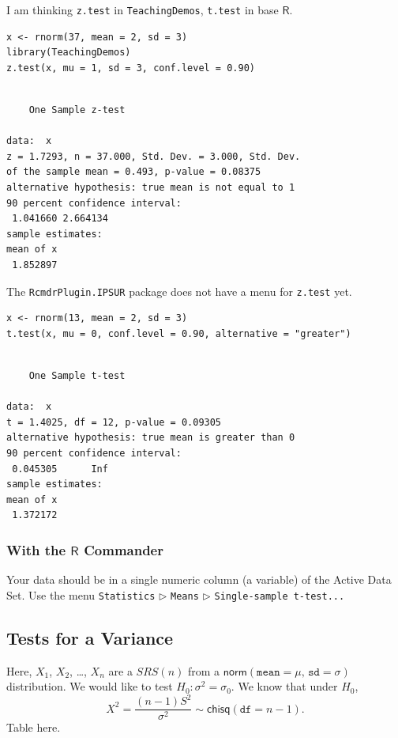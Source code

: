 \documentclass[captions=tableheading]{scrbook}
\begin{document}
I am thinking \texttt{z.test} in \texttt{TeachingDemos}, \texttt{t.test} in base \(\mathsf{R}\).


\begin{verbatim}
x <- rnorm(37, mean = 2, sd = 3)
library(TeachingDemos)
z.test(x, mu = 1, sd = 3, conf.level = 0.90)
\end{verbatim}


\begin{verbatim}
 
	One Sample z-test

data:  x 
z = 1.7293, n = 37.000, Std. Dev. = 3.000, Std. Dev.
of the sample mean = 0.493, p-value = 0.08375
alternative hypothesis: true mean is not equal to 1 
90 percent confidence interval:
 1.041660 2.664134 
sample estimates:
mean of x 
 1.852897
\end{verbatim}

The \texttt{RcmdrPlugin.IPSUR} package does not have a menu for \texttt{z.test} yet. 


\begin{verbatim}
x <- rnorm(13, mean = 2, sd = 3)
t.test(x, mu = 0, conf.level = 0.90, alternative = "greater")
\end{verbatim}


\begin{verbatim}

	One Sample t-test

data:  x 
t = 1.4025, df = 12, p-value = 0.09305
alternative hypothesis: true mean is greater than 0 
90 percent confidence interval:
 0.045305      Inf 
sample estimates:
mean of x 
 1.372172
\end{verbatim}
\subsubsection{With the \(\mathsf{R}\) Commander}
\label{sec-10-3-1-2}


Your data should be in a single numeric column (a variable) of the Active Data Set. Use the menu \texttt{Statistics} \(\triangleright\) \texttt{Means} \(\triangleright\) \texttt{Single-sample t-test...} 
\subsection{Tests for a Variance}
\label{sec-10-3-2}


Here, \(X_{1}\), \(X_{2}\), \ldots{}, \(X_{n}\) are a \(SRS(n)\) from a \(\mathsf{norm}(\mathtt{mean}=\mu,\,\mathtt{sd}=\sigma)\) distribution. We would like to test \(H_{0}:\sigma^{2}=\sigma_{0}\). We know that under \(H_{0}\),
\[
X^{2}=\frac{(n-1)S^{2}}{\sigma^{2}}\sim\mathsf{chisq}(\mathtt{df}=n-1).
\]
Table here.
\end{document}
